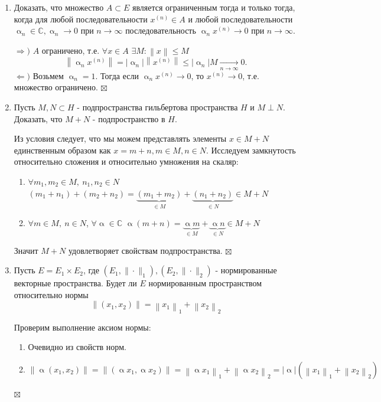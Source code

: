 \documentclass[a4paper, 12pt]{report}
\newenvironment{Proof} %
{\par\noindent{$\blacklozenge$}} %
{\hfill$\scriptstyle\boxtimes$}
\newcommand{\Cm}{\mathbb{C}}
\renewcommand{\leq}{\leqslant}
\renewcommand{\alpha}{\upalpha}
\newcommand\Norm[1]{\left\| #1 \right\|}
\begin{document}
\begin{enumerate}
		\item Доказать, что множество $A \subset E$ является ограниченным тогда и только тогда, когда для любой последовательности $x^{(n)} \in A$ и любой последовательности $\alpha_{n} \in \mathbb{C}, \alpha_{n} \rightarrow 0$ при $n \rightarrow \infty$ последовательность $\alpha_{n} x^{(n)} \rightarrow 0$ при $n \rightarrow \infty$.
		\begin{Proof}
			$\Rightarrow)$ $A$ ограничено, т.е. $\forall x \in A$ $\exists M: \Norm{x}\leq M$
			$$\Norm{\alpha_n x^{(n)}} = |\alpha_n| \Norm{x^{(n)}}\leq |\alpha_n|M \xrightarrow[n\to\infty]{}0.$$
			$\Leftarrow)$ Возьмем $\alpha_n = 1$. Тогда если $\alpha_n x^{(n)}\to 0$, то $x^{(n)}\to 0$, т.е. множество ограничено.
		\end{Proof}
		\item Пусть $M, N \subset H$ - подпространства гильбертова пространства $H$ и $M \perp N$. Доказать, что $M+N$ - подпространство в $H$.
		\begin{Proof}
			Из условия следует, что мы можем представлять элементы $x \in M + N$ единственным образом как $x = m +n, m \in M, n \in N$.
			Исследуем замкнутость относительно сложения и относительно умножения на скаляр:
			\begin{enumerate}
				\item $\forall m_1, m_2\in M,\ n_1, n_2 \in N$ $(m_1 + n_1) + (m_2+n_2) = \underbrace{(m_1 + m_2)}_{\in M} + \underbrace{(n_1 + n_2)}_{\in N} \in M+N$ 
				\item $\forall m\in M,\ n \in N$, $\forall \alpha \in \Cm$ $\alpha(m+n) = \underbrace{\alpha m}_{\in M} + \underbrace{\alpha n}_{\in N}\in M+N$
			\end{enumerate}
			Значит $M+N$ удовлетворяет свойствам подпространства.
		\end{Proof}
		\item Пусть $E=E_{1} \times E_{2}$, где $\left(E_{1},\|\cdot\|_{1}\right),\left(E_{2},\|\cdot\|_{2}\right)$ - нормированные векторные пространства. Будет ли $E$ нормированным пространством относительно нормы
		$$
		\left\|\left(x_{1}, x_{2}\right)\right\|=\left\|x_{1}\right\|_{1}+\left\|x_{2}\right\|_{2}
		$$
		\begin{Proof}
			Проверим выполнение аксиом нормы:
			\begin{enumerate}
				\item Очевидно из свойств норм.
				\item $\Norm{\alpha(x_1,x_2)} = \Norm{(\alpha x_1, \alpha x_2)} = \Norm{\alpha x_1}_1 + \Norm{\alpha x_2}_2 = |\alpha|(\Norm{x_1}_1 + \Norm{x_2}_2)$

\end{enumerate}
\end{Proof}
\end{enumerate}
\end{document}
